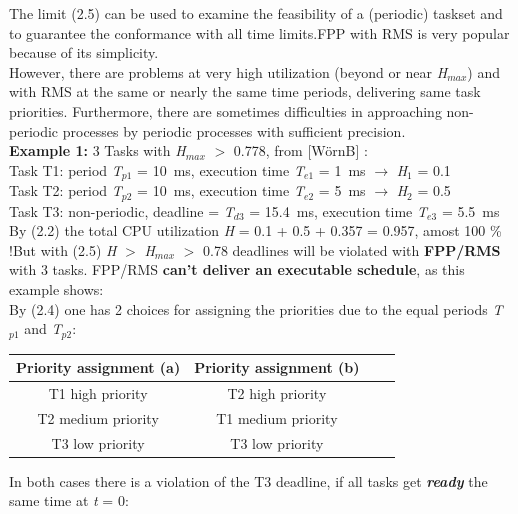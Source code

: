 The limit (2.5) can be used to examine the feasibility of a (periodic) taskset and to guarantee the conformance with all time limits.FPP with RMS is very popular because of its simplicity. \\

However, there are problems at very high utilization (beyond or near \textit{H${}_{max}$}) and with RMS at the same or nearly the same time periods, delivering same task priorities. Furthermore, there are sometimes difficulties in approaching non-periodic processes by periodic processes with sufficient precision.\\

\os{\newpage}
\textbf{Example 1:} 3 Tasks with \textit{H}${}_{max}$ $\mathrm{>}$ 0.778, from [W\"{o}rnB] : \\
Task T1: period \textit{T}${}_{p1}$ = 10~ms, execution time \textit{T}${}_{e1}$ = 1~ms $\rightarrow$ \textit{H}${}_{1}$ = 0.1\\
Task T2: period \textit{T}${}_{p2}$ = 10~ms, execution time\textit{ T}${}_{e2}$ = 5~ms $\rightarrow$ \textit{H}${}_{2}$ = 0.5\\
Task T3: non-periodic, deadline = \textit{T}${}_{d3}$ = 15.4~ms, execution time\textit{ T}${}_{e3}$ = 5.5~ms\\

By (2.2) the total CPU utilization \textit{H} = 0.1 + 0.5 + 0.357 = 0.957, amost 100 \% !But with (2.5) \textit{H} $\mathrm{>}$ \textit{H}${}_{max}$ $\mathrm{>}$ 0.78 deadlines will be violated with \textbf{FPP/RMS} with 3 tasks. FPP/RMS \textbf{can't deliver an executable schedule}, as this example shows:\\

By (2.4) one has 2 choices for assigning the priorities due to the equal periods \textit{T}${}_{p1}$\textit{ }and \textit{T}${}_{p2}$:\\

\begin{table}[h!]
\setlength{\tabcolsep}{10pt} %
\renewcommand{\arraystretch}{1.5} %
\small
\centering
 \begin{tabular}{|c|c|c|c|} 
 \hline
 \textbf{Priority assignment (a)} & \textbf{Priority assignment (b)} \\ [0.1ex] 
 \hline
 T1  high priority & T2  high  priority \\ 
 \hline
 T2  medium priority & T1  medium priority \\ 
  \hline
 T3  low priority & T3  low priority  \\ 
 \hline
 \end{tabular}
\end{table}
\os{\newpage}
In both cases there is a violation of the T3 deadline, if all tasks get \textbf{\textit{ready}} the same time at \textit{t} = 0: 

